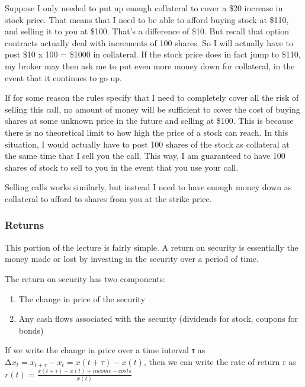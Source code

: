 \documentclass[letterpaper,10pt,english]{jupyterBook}
\begin{document}
\sphinxAtStartPar
Suppose I only needed to put up enough collateral to cover a \$20 increase in stock price. That means that I need to be able to afford buying stock at \$110, and selling it to you at \$100. That’s a difference of \$10. But recall that option contracts actually deal with increments of 100 shares. So I will actually have to post \$10 x 100 = \$1000 in collateral. If the stock price does in fact jump to \$110, my broker may then ask me to put even more money down for collateral, in the event that it continues to go up.

\sphinxAtStartPar
If for some reason the rules specify that I need to completely cover all the risk of selling this call, no amount of money will be sufficient to cover the cost of buying shares at some unknown price in the future and selling at \$100. This is because there is no theoretical limit to how high the price of a stock can reach. In this situation, I would actually have to post 100 shares of the stock as collateral at the same time that I sell you the call. This way, I am guaranteed to have 100 shares of stock to sell to you in the event that you use your call.

\sphinxAtStartPar
Selling calls works similarly, but instead I need to have enough money down as collateral to afford to  shares from you at the strike price.


\subsubsection{Returns}
\label{\detokenize{content/10-finance/options:returns}}
\sphinxAtStartPar
This portion of the lecture is fairly simple. A return on security is essentially the money made or lost by investing in the security over a period of time.

\sphinxAtStartPar
The return on security has two components:
\begin{enumerate}
%
\item {} 
\sphinxAtStartPar
The change in price of the security

\item {} 
\sphinxAtStartPar
Any cash flows associated with the security (dividends for stock, coupons for bonds)

\end{enumerate}

\sphinxAtStartPar
If we write the change in price over a time interval τ as
\(∆x_t = x_{t+τ} − x_t = x(t + τ) − x(t)\),
then we can write the rate of return r as
\(r(t) = \frac{x(t + τ) −x(t) + income − costs}{x(t)}\)
\end{document}
